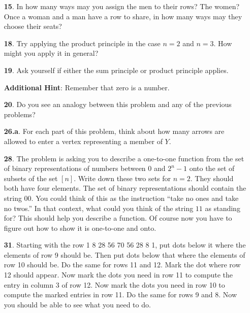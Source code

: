 \documentclass[10pt,]{book}
\theoremstyle{plain}
\theoremstyle{definition}
\theoremstyle{definition}
\numberwithin{equation}{chapter}
\begin{document}
\begin{itemize}[itemsep=1em]
\item[\textbf{15}.]\hypertarget{p-104}{}%
In how many ways may you assign the men to their rows? The women? Once a woman and a man have a row to share, in how many ways may they choose their seats?%

\item[\textbf{18}.]\hypertarget{p-111}{}%
Try applying the product principle in the case \(n = 2\) and \(n = 3\). How might you apply it in general?%

\item[\textbf{19}.]\hypertarget{p-114}{}%
Ask yourself if either the sum principle or product principle applies.%

\par\smallskip
\noindent\textbf{Additional Hint}: \hypertarget{p-115}{}%
Remember that zero is a number.%

\item[\textbf{20}.]\hypertarget{p-118}{}%
Do you see an analogy between this problem and any of the previous problems?%

\item[\textbf{26.a}.]\hypertarget{p-137}{}%
For each part of this problem, think about how many arrows are allowed to enter a vertex representing a member of \(Y\).%

\item[\textbf{28}.]\hypertarget{p-150}{}%
The problem is asking you to describe a one-to-one function from the set of binary representations of numbers between \(0\) and \(2^n-1\) onto the set of subsets of the set \([n]\). Write down these two sets for \(n = 2\). They should both have four elements. The set of binary representations should contain the string \(00\). You could think of this as the instruction ``take no ones and take no twos.'' In that context, what could you think of the string \(11\) as standing for? This should help you describe a function. Of course now you have to figure out how to show it is one-to-one and onto.%

\item[\textbf{31}.]\hypertarget{p-169}{}%
Starting with the row 1 8 28 56 70 56 28 8 1, put dots below it where the elements of row 9 should be. Then put dots below that where the elements of row 10 should be. Do the same for rows 11 and 12. Mark the dot where row 12 should appear. Now mark the dots you need in row 11 to compute the entry in column 3 of row 12. Now mark the dots you need in row 10 to compute the marked entries in row 11. Do the same for rows 9 and 8. Now you should be able to see what you need to do.%


\end{itemize}
\end{document}
